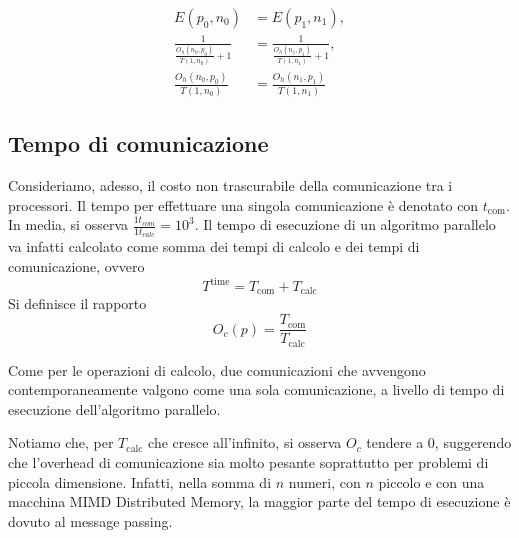 $$\begin{aligned}
E(p_{0},n_{0})&=E(p_{1},n_{1}), \\
\frac{1}{\frac{O_{h}(n_{0},p_{0})}{T(1,n_{0})} + 1} &= \frac{1}{\frac{O_{h}(n_{1},p_{1})}{T(1,n_{1})} + 1}, \\
\frac{O_{h}(n_{0},p_{0})}{T(1,n_{0})} &= \frac{O_{h}(n_{1},p_{1})}{T(1,n_{1})}
\end{aligned}$$

\subsection{Tempo di comunicazione}
Consideriamo, adesso, il costo non trascurabile della comunicazione tra i processori. Il tempo per effettuare una singola comunicazione è denotato con $t_{\text{com}}$. In media, si osserva $\frac{1 t_{com}}{1 t_{calc}} = 10^3$. Il tempo di esecuzione di un algoritmo parallelo va infatti calcolato come somma dei tempi di calcolo e dei tempi di comunicazione, ovvero
$$T^{\text{time}}=T_{\text{com}}+T_{\text{calc}}$$
Si definisce  il rapporto
$$O_{c}(p) = \frac{T_{\text{com}}}{T_{\text{calc}}}$$

Come per le operazioni di calcolo, due comunicazioni che avvengono contemporaneamente valgono come una sola comunicazione, a livello di tempo di esecuzione dell'algoritmo parallelo.

Notiamo che, per $T_{\text{calc}}$ che cresce all'infinito, si osserva $O_{c}$ tendere a $0$, suggerendo che l'overhead di comunicazione sia molto pesante soprattutto per problemi di piccola dimensione. Infatti, nella somma di $n$ numeri, con $n$ piccolo e con una macchina MIMD Distributed Memory, la maggior parte del tempo di esecuzione è dovuto al message passing.
